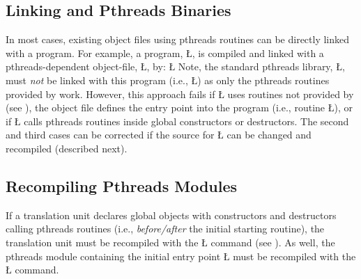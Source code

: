 \documentclass[openright,twoside]{report}
\begin{document}
\subsection{\texorpdfstring{Linking \uC and Pthreads Binaries}{Linking uC++ and Pthreads Binaries}}

In most cases, existing object files using pthreads routines can be directly linked with a \uC program.
For example, a \uC program, \LGinlinetrue\LGbegin\lgrinde\L{}\endlgrinde\LGend{}, is compiled and linked with a pthreads-dependent object-file, \LGinlinetrue\LGbegin\lgrinde\L{}\endlgrinde\LGend{}, by:
\LGinlinefalse\LGbegin\lgrinde
\L{}
\endlgrinde\LGend
Note, the standard pthreads library, \LGinlinetrue\LGbegin\lgrinde\L{}\endlgrinde\LGend{}, must \emph{not} be linked with this program (i.e., \LGinlinetrue\LGbegin\lgrinde\L{}\endlgrinde\LGend{}) as only the pthreads routines provided by \uC work.
However, this approach fails if \LGinlinetrue\LGbegin\lgrinde\L{}\endlgrinde\LGend{} uses routines not provided by \uC (see ), the object file defines the entry point into the program (i.e., routine \LGinlinetrue\LGbegin\lgrinde\L{}\endlgrinde\LGend{}), or if \LGinlinetrue\LGbegin\lgrinde\L{}\endlgrinde\LGend{} calls pthreads routines inside global constructors or destructors. 
The second and third cases can be corrected if the source for \LGinlinetrue\LGbegin\lgrinde\L{}\endlgrinde\LGend{} can be changed and recompiled (described next).


\subsection{Recompiling Pthreads Modules}

If a translation unit declares global objects with constructors and destructors calling pthreads routines (i.e., \emph{before/after} the initial starting routine), the translation unit must be recompiled with the \LGinlinetrue\LGbegin\lgrinde\L{}\endlgrinde\LGend{} command (see ).
As well, the pthreads module containing the initial entry point \LGinlinetrue\LGbegin\lgrinde\L{}\endlgrinde\LGend{} must be recompiled with the \LGinlinetrue\LGbegin\lgrinde\L{}\endlgrinde\LGend{} command.
\end{document}
